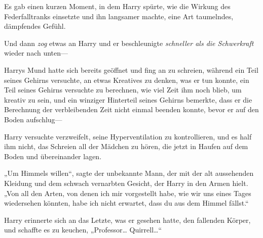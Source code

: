 Es gab einen kurzen Moment, in dem Harry spürte, wie die Wirkung des Federfalltranks einsetzte und ihn langsamer machte, eine Art taumelndes, dämpfendes Gefühl.

Und dann \emph{zog} etwas an Harry und er beschleunigte \emph{schneller als die Schwerkraft} wieder nach unten—

Harrys Mund hatte sich bereits geöffnet und fing an zu schreien, während ein Teil seines Gehirns versuchte, an etwas Kreatives zu denken, was er tun konnte, ein Teil seines Gehirns versuchte zu berechnen, wie viel Zeit ihm noch blieb, um kreativ zu sein, und ein winziger Hinterteil seines Gehirns bemerkte, dass er die Berechnung der verbleibenden Zeit nicht einmal beenden konnte, bevor er auf den Boden aufschlug—

\later

Harry versuchte verzweifelt, seine Hyperventilation zu kontrollieren, und es half ihm nicht, das Schreien all der Mädchen zu hören, die jetzt in Haufen auf dem Boden und übereinander lagen.

„Um Himmels willen“, sagte der unbekannte Mann, der mit der alt aussehenden Kleidung und dem schwach vernarbten Gesicht, der Harry in den Armen hielt. „Von all den Arten, von denen ich mir vorgestellt habe, wie wir uns eines Tages wiedersehen könnten, habe ich nicht erwartet, dass du aus dem Himmel fällst.“

Harry erinnerte sich an das Letzte, was er gesehen hatte, den fallenden Körper, und schaffte es zu keuchen, „Professor… Quirrell…“

